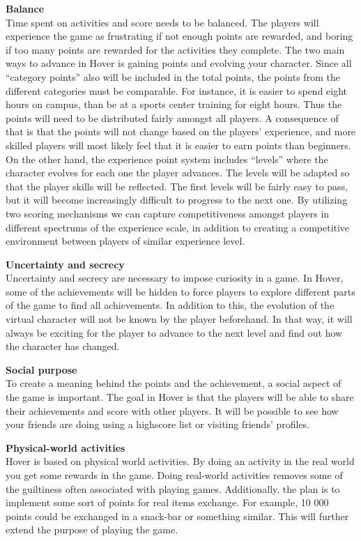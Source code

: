 \documentclass[../Main.tex]{subfiles}
\begin{document}
\textbf{Balance}\\
Time spent on activities and score needs to be balanced. The players will experience the game as frustrating if not enough points are rewarded, and boring if too many points are rewarded for the activities they complete. The two main ways to advance in Hover is gaining points and evolving your character. Since all “category points” also will be included in the total points, the points from the different categories must be comparable. For instance, it is easier to spend eight hours on campus, than be at a sports center training for eight hours. Thus the points will need to be distributed fairly amongst all players. A consequence of that is that the points will not change based on the players’ experience, and more skilled players will most likely feel that it is easier to earn points than beginners. On the other hand, the experience point system includes “levels” where the character evolves for each one the player advances. The levels will be adapted so that the player skills will be reflected. The first levels will be fairly easy to pass, but it will become increasingly difficult to progress to the next one. By utilizing two scoring mechanisms we can capture competitiveness amongst players in different spectrums of the experience scale, in addition to creating a competitive environment between players of similar experience level.

\textbf{Uncertainty and secrecy}\\
Uncertainty and secrecy are necessary to impose curiosity in a game. In Hover, some of the achievements will be hidden to force players to explore different parts of the game to find all achievements. In addition to this, the evolution of the virtual character will not be known by the player beforehand. In that way, it will always be exciting for the player to advance to the next level and find out how the character has changed.  

\textbf{Social purpose}\\
To create a meaning behind the points and the achievement, a social aspect of the game is important. The goal in Hover is that the players will be able to share their achievements and score with other players. It will be possible to see how your friends are doing using a highscore list or visiting friends’ profiles. 

\textbf{Physical-world activities}\\
Hover is based on physical world activities. By doing an activity in the real world you get some rewards in the game. Doing real-world activities removes some of the guiltiness often associated with playing games. Additionally, the plan is to implement some sort of points for real items exchange. For example, 10 000 points could be exchanged in a snack-bar or something similar. This will further extend the purpose of playing the game.
\end{document}
